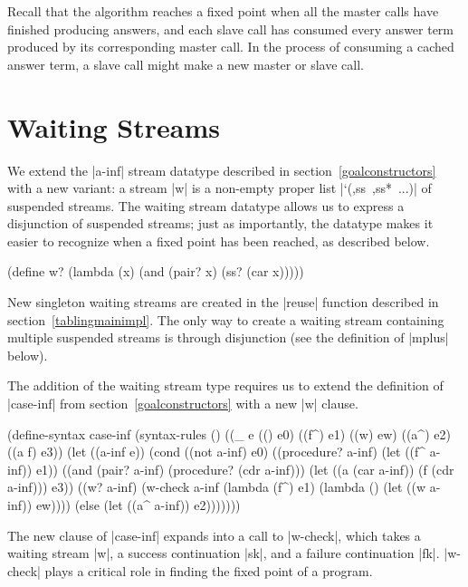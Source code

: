 Recall that the algorithm reaches a fixed point when all the master
calls have finished producing answers, and each slave call has
consumed every answer term produced by its corresponding master call.
In the process of consuming a cached answer term, a slave call might
make a new master or slave call.

\section{Waiting Streams}\label{tablingcaseinf}

We extend the \mbox{\scheme|a-inf|} stream datatype described in
section~\ref{goalconstructors} with a new variant: a  stream \scheme|w|
is a non-empty proper list \mbox{\scheme|`(,ss ,ss* ...)|} of suspended streams.
The waiting stream datatype allows us to express a disjunction of suspended streams; just
as importantly, the datatype makes it easier to recognize when a fixed point has been reached,
as described below.

\schemedisplayspace
\begin{schemedisplay}
(define w? (lambda (x) (and (pair? x) (ss? (car x)))))
\end{schemedisplay}

\noindent New singleton waiting streams are created in the
\scheme|reuse| function described in section~\ref{tablingmainimpl}.
The only way to create a waiting stream containing multiple suspended
streams is through disjunction (see the definition of \scheme|mplus|
below).

The addition of the waiting stream type requires us to extend the
definition of \scheme|case-inf| from section~\ref{goalconstructors}
with a new \scheme|w| clause.

\schemedisplayspace
\begin{schemedisplay} 
(define-syntax case-inf
  (syntax-rules ()
    ((_ e (() e0) ((f^) e1) ((w) ew) ((a^) e2) ((a f) e3))
     (let ((a-inf e))
       (cond
         ((not a-inf) e0)
         ((procedure? a-inf) (let ((f^ a-inf)) e1))
         ((and (pair? a-inf) (procedure? (cdr a-inf)))
          (let ((a (car a-inf)) (f (cdr a-inf))) e3))
         ((w? a-inf) (w-check a-inf
                              (lambda (f^) e1)
                              (lambda () (let ((w a-inf)) ew))))
         (else (let ((a^ a-inf)) e2)))))))
\end{schemedisplay}

The new clause of \scheme|case-inf| expands into a call to
\scheme|w-check|, which takes a waiting stream \scheme|w|, a success
continuation \scheme|sk|, and a failure continuation \scheme|fk|.
\scheme|w-check| plays a critical role in finding the fixed point of a
program.


